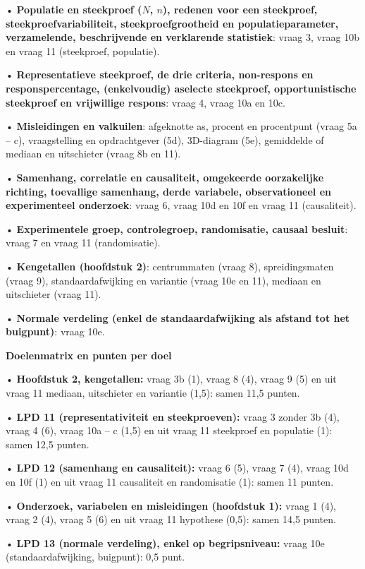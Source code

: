 \documentclass{article}
\begin{document}
\begin{docentenpagina}
\begin{oplossing}
• \textbf{Populatie en steekproef ($N$, $n$), redenen voor een steekproef, steekproefvariabiliteit, steekproefgrootheid en populatieparameter, verzamelende, beschrijvende en verklarende statistiek}: vraag 3, vraag 10b en vraag 11 (steekproef, populatie).

• \textbf{Representatieve steekproef, de drie criteria, non-respons en responspercentage, (enkelvoudig) aselecte steekproef, opportunistische steekproef en vrijwillige respons}: vraag 4, vraag 10a en 10c.

• \textbf{Misleidingen en valkuilen}: afgeknotte as, procent en procentpunt (vraag 5a – c), vraagstelling en opdrachtgever (5d), 3D-diagram (5e), gemiddelde of mediaan en uitschieter (vraag 8b en 11).

• \textbf{Samenhang, correlatie en causaliteit, omgekeerde oorzakelijke richting, toevallige samenhang, derde variabele, observationeel en experimenteel onderzoek}: vraag 6, vraag 10d en 10f en vraag 11 (causaliteit).

• \textbf{Experimentele groep, controlegroep, randomisatie, causaal besluit}: vraag 7 en vraag 11 (randomisatie).

• \textbf{Kengetallen (hoofdstuk 2)}: centrummaten (vraag 8), spreidingsmaten (vraag 9), standaardafwijking en variantie (vraag 10e en 11), mediaan en uitschieter (vraag 11).

• \textbf{Normale verdeling (enkel de standaardafwijking als afstand tot het buigpunt)}: vraag 10e.
\end{oplossing}

\begin{oplossing}
\textbf{Doelenmatrix en punten per doel}

• \textbf{Hoofdstuk 2, kengetallen:} vraag 3b (1), vraag 8 (4), vraag 9 (5) en uit vraag 11 mediaan, uitschieter en variantie (1,5): samen 11,5 punten.

• \textbf{LPD 11 (representativiteit en steekproeven):} vraag 3 zonder 3b (4), vraag 4 (6), vraag 10a – c (1,5) en uit vraag 11 steekproef en populatie (1): samen 12,5 punten.

• \textbf{LPD 12 (samenhang en causaliteit):} vraag 6 (5), vraag 7 (4), vraag 10d en 10f (1) en uit vraag 11 causaliteit en randomisatie (1): samen 11 punten.

• \textbf{Onderzoek, variabelen en misleidingen (hoofdstuk 1):} vraag 1 (4), vraag 2 (4), vraag 5 (6) en uit vraag 11 hypothese (0,5): samen 14,5 punten.

• \textbf{LPD 13 (normale verdeling), enkel op begripsniveau:} vraag 10e (standaardafwijking, buigpunt): 0,5 punt.


\end{oplossing}
\end{docentenpagina}
\end{document}

